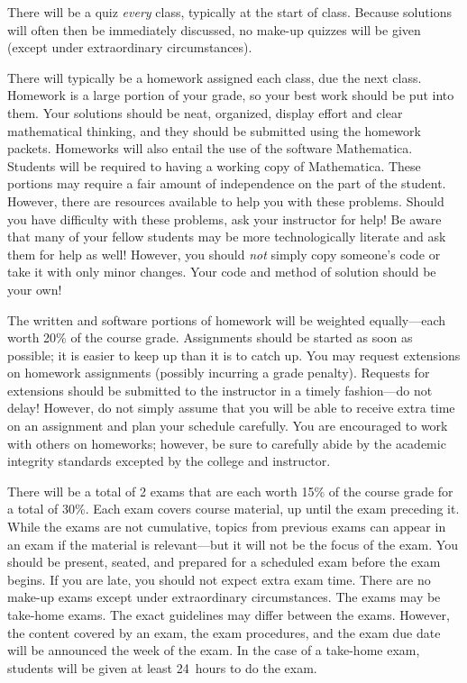\documentclass[11pt,letterpaper]{article}
\begin{document}
There will be a quiz \textit{every} class, typically at the start of class. Because solutions will often then be immediately discussed, no make-up quizzes will be given (except under extraordinary circumstances). \pspace


There will typically be a homework assigned each class, due the next class. Homework is a large portion of your grade, so your best work should be put into them. Your solutions should be neat, organized, display effort and clear mathematical thinking, and they should be submitted using the homework packets. Homeworks will also entail the use of the software Mathematica. Students will be required to having a working copy of Mathematica. These portions may require a fair amount of independence on the part of the student. However, there are resources available to help you with these problems. Should you have difficulty with these problems, ask your instructor for help! Be aware that many of your fellow students may be more technologically literate and ask them for help as well! However, you should \textit{not} simply copy someone's code or take it with only minor changes. Your code and method of solution should be your own! \pspace

The written and software portions of homework will be weighted equally---each worth 20\% of the course grade. Assignments should be started as soon as possible; it is easier to keep up than it is to catch up. You may request extensions on homework assignments (possibly incurring a grade penalty). Requests for extensions should be submitted to the instructor in a timely fashion---do not delay! However, do not simply assume that you will be able to receive extra time on an assignment and plan your schedule carefully. You are encouraged to work with others on homeworks; however, be sure to carefully abide by the academic integrity standards excepted by the college and instructor. \pspace



There will be a total of 2 exams that are each worth 15\% of the course grade for a total of 30\%. Each exam covers course material, up until the exam preceding it. While the exams are not cumulative, topics from previous exams can appear in an exam if the material is relevant---but it will not be the focus of the exam. You should be present, seated, and prepared for a scheduled exam before the exam begins. If you are late, you should not expect extra exam time. There are no make-up exams except under extraordinary circumstances. The exams may be take-home exams. The exact guidelines may differ between the exams. However, the content covered by an exam, the exam procedures, and the exam due date will be announced the week of the exam. In the case of a take-home exam, students will be given at least 24~hours to do the exam. \pspace
\end{document}
